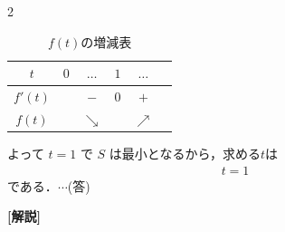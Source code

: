 \documentclass[../../../../main.tex]{subfiles}
\begin{document}
\begin{multicols}{2}
  \begin{table}[H]
    \centering
    \caption{$f(t)$の増減表}
    \label{1990-4:table:1}
    \begin{tabular}{|c|c|c|c|c|c|}
      \hline
      $t$     & $0$ & $\dots$    & $1$ & $\dots$    & \\
      \hline
      $f'(t)$ &     & $-$        & $0$ & $+$        & \\
      \hline
      $f(t)$  &     & $\searrow$ &     & $\nearrow$ & \\
      \hline
    \end{tabular}
  \end{table}

  よって $t=1$ で $S$ は最小となるから，求める$t$は
  \begin{align*}
    t = 1
  \end{align*}
  である．$\cdots$(答)

  {\bf[解説]}

  \newpage
\end{multicols}
\end{document}
